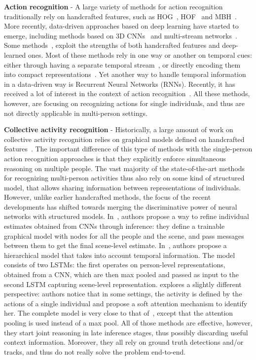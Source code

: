 \documentclass[10pt,twocolumn,letterpaper]{article}
\begin{document}
\noindent \textbf{Action recognition} - A large variety of methods for action
recognition traditionally rely on handcrafted features, such as
HOG~\cite{Dalal2005,Weinland10}, HOF~\cite{Laptev2008} and MBH~\cite{Wang2013}. 
More recently, data-driven approaches based on deep learning have
started to emerge, including methods based on 3D CNNs~\cite{Ji2013} and multi-stream
networks~\cite{Feichtenhofer2016,Singh2016a}. Some
methods~\cite{Wang2015,Singh2016b}, exploit the strengths of both handcrafted
features and deep-learned ones. Most of these methods rely in one way or
another on temporal cues: either through having a separate temporal
stream~\cite{Feichtenhofer2016, Singh2016b}, or directly encoding them into
compact representations~\cite{Laptev2008,Wang2013,Wang2013}. Yet another way to
handle temporal information in a data-driven way is Recurrent Neural Networks (RNNs).
Recently, it has received a lot of interest in the context of action
recognition~\cite{Singh2016a,Du2015,Veeriah2015,Donahue2015}. All these methods,
however, are focusing on recognizing actions for single individuals, and thus
are not directly applicable in multi-person settings.

\noindent \textbf{Collective activity recognition} - Historically, a large
amount of work on collective activity recognition relies on graphical models
defined on handcrafted features~\cite{Choi2014, Choi2011, Amer2014}. The
important difference of this type of methods with the single-person action
recognition approaches is that they explicitly enforce simultaneous 
reasoning on multiple people. The vast majority of the state-of-the-art methods for
recognizing multi-person activities thus also rely on some kind of structured model,
that allows sharing information between representations of individuals.
However, unlike earlier handcrafted methods, the focus of the recent
developments has shifted towards merging the discriminative power of neural networks
with structured models. In~\cite{Deng2016}, authors propose a way to refine
individual estimates obtained from CNNs through inference: they define a
trainable graphical model with nodes for all the people and the scene, and pass
messages between them to get the final scene-level
estimate. In~\cite{Ibrahim2016}, authors propose a hierarchical model that takes
into account temporal information. The model consists of two LSTMs: the first
operates on person-level representations, obtained from a CNN, which are then
max pooled and passed as input to the second LSTM capturing scene-level
representation.  \cite{Ramanathan2016} explores a slightly different
perspective: authors notice that in some settings, the activity is defined by
the actions of a single individual and propose a soft attention mechanism to
identify her. The complete model is very close to that of~\cite{Ibrahim2016},
except that the attention pooling is used instead of a max pool. All of those
methods are effective, however, they start joint reasoning in late inference
stages, thus possibly
discarding useful context information. Moreover, they all rely on ground truth
detections and/or tracks, and thus do not really solve the problem end-to-end.
\end{document}
